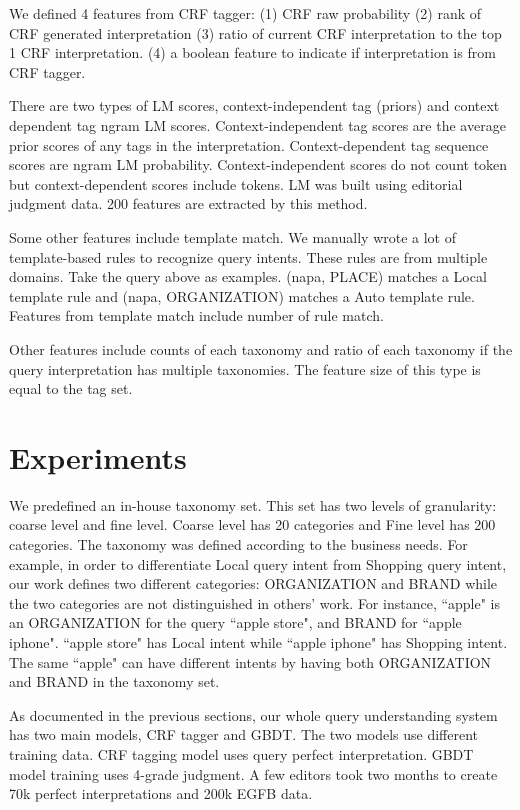 \documentclass{acm_proc_article-sp}
\begin{document}
We defined 4 features from CRF tagger: (1) CRF raw probability (2) rank of CRF generated interpretation (3) ratio of current CRF interpretation to the top 1 CRF interpretation. (4) a boolean feature to indicate if interpretation is from CRF tagger.

There are two types of LM scores, context-independent tag (priors) and context dependent tag ngram LM scores. Context-independent tag scores are the average prior scores of any tags in the interpretation. Context-dependent tag sequence scores are ngram LM probability. Context-independent scores do not count token but context-dependent scores include tokens.
LM was built using editorial judgment data. 200 features are extracted by this method.

Some other features include template match. We manually wrote a lot of template-based rules to recognize query intents. These rules are from multiple domains. Take the query above as examples. (napa, PLACE) matches a Local template rule and (napa, ORGANIZATION) matches a Auto template rule. Features from template match include number of rule match.

Other features include counts of each taxonomy and ratio of each taxonomy if the query interpretation has multiple taxonomies. The feature size of this type is equal to the tag set. 

\section{Experiments}

We predefined an in-house taxonomy set. This set has two levels of granularity: coarse level and fine level. Coarse level has 20 categories and Fine level has 200 categories. The taxonomy was defined according to the business needs. For example, in order to differentiate Local query intent from Shopping query intent, our work defines two different categories: ORGANIZATION and BRAND while the two categories are not distinguished in others' work. For instance, ``apple" is an ORGANIZATION for the query ``apple store", and BRAND for ``apple iphone". ``apple store" has Local intent while ``apple iphone" has Shopping intent. The same ``apple" can have different intents by having both ORGANIZATION and BRAND in the taxonomy set. 

As documented in the previous sections, our whole query understanding system has two main models, CRF tagger and GBDT. The two models use different training data. CRF tagging model uses query perfect interpretation. GBDT model training uses 4-grade judgment. A few editors took two months to create 70k perfect interpretations and 200k EGFB data. 
\end{document}
